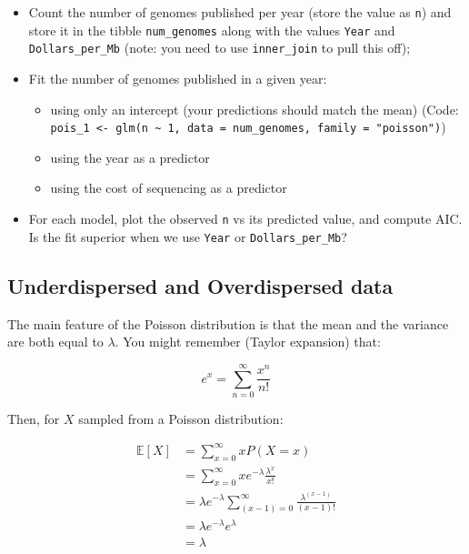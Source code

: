\documentclass[
  letterpaper,
  DIV=11,
  numbers=noendperiod]{scrreprt}
\providecommand{\tightlist}{%
  \setlength{\itemsep}{0pt}\setlength{\parskip}{0pt}}\usepackage{longtable,booktabs,array}
\begin{document}
\begin{itemize}
\tightlist
\item
  Count the number of genomes published per year (store the value as
  \texttt{n}) and store it in the tibble \texttt{num\_genomes} along
  with the values \texttt{Year} and \texttt{Dollars\_per\_Mb} (note: you
  need to use \texttt{inner\_join} to pull this off);
\item
  Fit the number of genomes published in a given year:

  \begin{itemize}
  \tightlist
  \item
    using only an intercept (your predictions should match the mean)
    (Code:
    \texttt{pois\_1\ \textless{}-\ glm(n\ \textasciitilde{}\ 1,\ data\ =\ num\_genomes,\ family\ =\ "poisson")})
  \item
    using the year as a predictor
  \item
    using the cost of sequencing as a predictor
  \end{itemize}
\item
  For each model, plot the observed \texttt{n} vs its predicted value,
  and compute AIC. Is the fit superior when we use \texttt{Year} or
  \texttt{Dollars\_per\_Mb}?
\end{itemize}

\subsection{Underdispersed and Overdispersed
data}\label{underdispersed-and-overdispersed-data}

The main feature of the Poisson distribution is that the mean and the
variance are both equal to \(\lambda\). You might remember (Taylor
expansion) that:

\[
e^x = \sum_{n = 0}^{\infty} \frac{x^n}{n!}
\]

Then, for \(X\) sampled from a Poisson distribution:

\[
\begin{aligned}
\mathbb E[X] &= \sum_{x = 0}^{\infty} x P(X = x) \\
&= \sum_{x = 0}^{\infty} x e^{-\lambda} \frac{\lambda^x}{x!} \\
&= \lambda e^{-\lambda} \sum_{(x - 1) = 0}^{\infty} \frac{\lambda^{(x-1)}}{(x-1)!} \\
&= \lambda e^{-\lambda}e^{\lambda} \\
&= \lambda
\end{aligned}
\]
\end{document}
